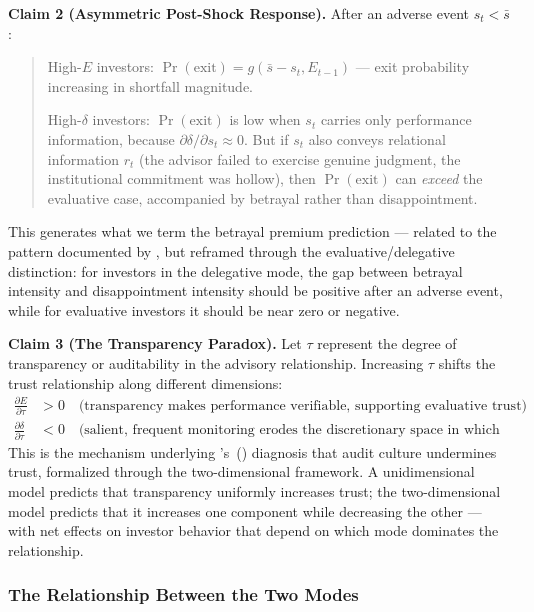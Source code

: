 \textbf{Claim 2 (Asymmetric Post-Shock Response).} After an adverse event $s_t < \bar{s}$:
\begin{quote}
High-$E$ investors: $\Pr(\text{exit}) = g(\bar{s} - s_t, E_{t-1})$ --- exit probability increasing in shortfall magnitude.

High-$\delta$ investors: $\Pr(\text{exit})$ is low when $s_t$ carries only performance information, because $\partial \delta / \partial s_t \approx 0$. But if $s_t$ also conveys relational information $r_t$ (the advisor failed to exercise genuine judgment, the institutional commitment was hollow), then $\Pr(\text{exit})$ can \textit{exceed} the evaluative case, accompanied by betrayal rather than disappointment.
\end{quote}
This generates what we term the betrayal premium prediction --- related to the pattern documented by \citet{kormylo2026}, but reframed through the evaluative/delegative distinction: for investors in the delegative mode, the gap between betrayal intensity and disappointment intensity should be positive after an adverse event, while for evaluative investors it should be near zero or negative.

\textbf{Claim 3 (The Transparency Paradox).} Let $\tau$ represent the degree of transparency or auditability in the advisory relationship. Increasing $\tau$ shifts the trust relationship along different dimensions:
\begin{align*}
\frac{\partial E}{\partial \tau} &> 0 \quad \text{(transparency makes performance verifiable, supporting evaluative trust)} \\
\frac{\partial \delta}{\partial \tau} &< 0 \quad \text{(salient, frequent monitoring erodes the discretionary space in which delegative trust operates)}
\end{align*}
This is the mechanism underlying \citeauthor{ONeill2002}'s~(\citeyear{ONeill2002}) diagnosis that audit culture undermines trust, formalized through the two-dimensional framework. A unidimensional model predicts that transparency uniformly increases trust; the two-dimensional model predicts that it increases one component while decreasing the other --- with net effects on investor behavior that depend on which mode dominates the relationship.

\subsubsection{The Relationship Between the Two Modes}
\label{subsubsec:relationship}

